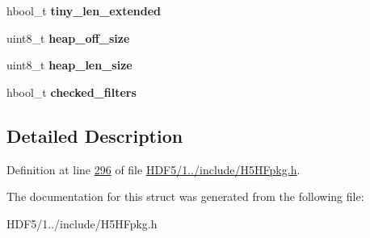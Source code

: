 \begin{DoxyCompactItemize}
\mbox{\label{struct_h5_h_f__hdr__t_a02005fa8eef166c69fa425576dd5b4e5}} 
hbool\+\_\+t {\bfseries tiny\+\_\+len\+\_\+extended}
\item 
\mbox{\label{struct_h5_h_f__hdr__t_a484040c59f8ed950c39bb11314af8282}} 
uint8\+\_\+t {\bfseries heap\+\_\+off\+\_\+size}
\item 
\mbox{\label{struct_h5_h_f__hdr__t_a4e2b14694bb77002e3529a00df7342ab}} 
uint8\+\_\+t {\bfseries heap\+\_\+len\+\_\+size}
\item 
\mbox{\label{struct_h5_h_f__hdr__t_a5eac6837c68c011c5b0b41a28eccfb43}} 
hbool\+\_\+t {\bfseries checked\+\_\+filters}
\end{DoxyCompactItemize}


\subsection{Detailed Description}


Definition at line \hyperlink{_h_d_f5_21_810_81_2include_2_h5_h_fpkg_8h_source_l00296}{296} of file \hyperlink{_h_d_f5_21_810_81_2include_2_h5_h_fpkg_8h_source}{H\+D\+F5/1../include/\+H5\+H\+Fpkg.\+h}.



The documentation for this struct was generated from the following file\+:\begin{DoxyCompactItemize}
\item 
H\+D\+F5/1../include/\+H5\+H\+Fpkg.\+h\end{DoxyCompactItemize}
